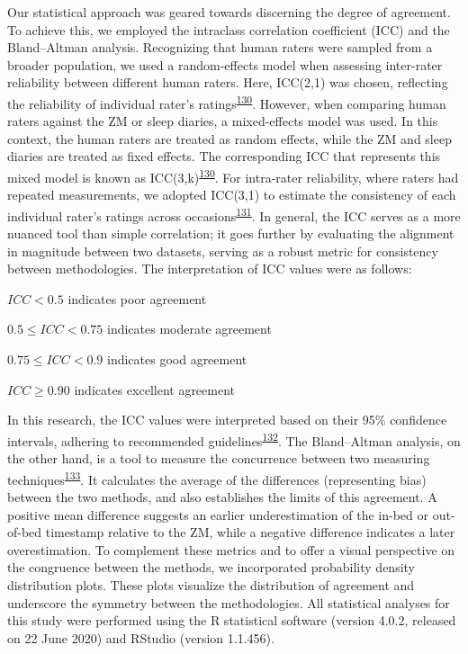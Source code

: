 \documentclass[
  10pt,
]{scrbook}
\begin{document}
Our statistical approach was geared towards discerning the degree of
agreement. To achieve this, we employed the intraclass correlation
coefficient (ICC) and the Bland--Altman analysis. Recognizing that human
raters were sampled from a broader population, we used a random-effects
model when assessing inter-rater reliability between different human
raters. Here, ICC(2,1) was chosen, reflecting the reliability of
individual rater's
ratings\textsuperscript{\protect\hyperlink{ref-shrout_1979}{130}}.
However, when comparing human raters against the ZM or sleep diaries, a
mixed-effects model was used. In this context, the human raters are
treated as random effects, while the ZM and sleep diaries are treated as
fixed effects. The corresponding ICC that represents this mixed model is
known as
ICC(3,k)\textsuperscript{\protect\hyperlink{ref-shrout_1979}{130}}. For
intra-rater reliability, where raters had repeated measurements, we
adopted ICC(3,1) to estimate the consistency of each individual rater's
ratings across
occasions\textsuperscript{\protect\hyperlink{ref-mcgraw_1996}{131}}. In
general, the ICC serves as a more nuanced tool than simple correlation;
it goes further by evaluating the alignment in magnitude between two
datasets, serving as a robust metric for consistency between
methodologies. The interpretation of ICC values were as follows:

\(ICC < 0.5\) indicates poor agreement

\(0.5 ≤ ICC < 0.75\) indicates moderate agreement

\(0.75 ≤ ICC < 0.9\) indicates good agreement

\(ICC ≥ 0.90\) indicates excellent agreement

In this research, the ICC values were interpreted based on their 95\%
confidence intervals, adhering to recommended
guidelines\textsuperscript{\protect\hyperlink{ref-koo_guideline_2016}{132}}.
The Bland--Altman analysis, on the other hand, is a tool to measure the
concurrence between two measuring
techniques\textsuperscript{\protect\hyperlink{ref-bland_measuring_1999}{133}}.
It calculates the average of the differences (representing bias) between
the two methods, and also establishes the limits of this agreement. A
positive mean difference suggests an earlier underestimation of the
in-bed or out-of-bed timestamp relative to the ZM, while a negative
difference indicates a later overestimation. To complement these metrics
and to offer a visual perspective on the congruence between the methods,
we incorporated probability density distribution plots. These plots
visualize the distribution of agreement and underscore the symmetry
between the methodologies. All statistical analyses for this study were
performed using the R statistical software (version 4.0.2, released on
22 June 2020) and RStudio (version 1.1.456).
\end{document}

